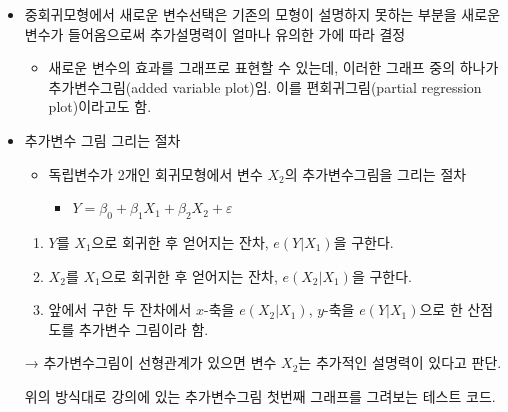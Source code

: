 \documentclass[
]{article}
\providecommand{\tightlist}{%
  \setlength{\itemsep}{0pt}\setlength{\parskip}{0pt}}
\begin{document}
\begin{itemize}
\item
  중회귀모형에서 새로운 변수선택은 기존의 모형이 설명하지 못하는 부분을
  새로운 변수가 들어옴으로써 추가설명력이 얼마나 유의한 가에 따라 결정

  \begin{itemize}
  \tightlist
  \item
    새로운 변수의 효과를 그래프로 표현할 수 있는데, 이러한 그래프 중의
    하나가 추가변수그림(added variable plot)임. 이를 편회귀그림(partial
    regression plot)이라고도 함.
  \end{itemize}
\item
  추가변수 그림 그리는 절차

  \begin{itemize}
  \tightlist
  \item
    독립변수가 2개인 회귀모형에서 변수 \(X_2\)의 추가변수그림을 그리는
    절차

    \begin{itemize}
    \tightlist
    \item
      \(Y = \beta_0 + \beta_1 X_1 + \beta_2 X_2 + \varepsilon\)
    \end{itemize}
  \end{itemize}

  \begin{enumerate}
  \def\labelenumi{\arabic{enumi}.}
  \tightlist
  \item
    \(Y\)를 \(X_1\)으로 회귀한 후 얻어지는 잔차, \(e(Y|X_1)\)을 구한다.
  \item
    \(X_2\)를 \(X_1\)으로 회귀한 후 얻어지는 잔차, \(e(X_2|X_1)\)을
    구한다.
  \item
    앞에서 구한 두 잔차에서 \(x\)-축을 \(e(X_2|X_1)\), \(y\)-축을
    \(e(Y|X_1)\)으로 한 산점도를 추가변수 그림이라 함.
  \end{enumerate}

  → 추가변수그림이 선형관계가 있으면 변수 \(X_2\)는 추가적인 설명력이
  있다고 판단.

  위의 방식대로 강의에 있는 추가변수그림 첫번째 그래프를 그려보는 테스트
  코드.


\end{itemize}
\end{document}
